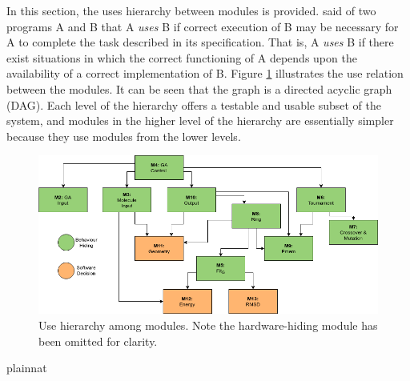 \documentclass[12pt, titlepage]{article}
\begin{document}
In this section, the uses hierarchy between modules is
provided. \citet{Parnas1978} said of two programs A and B that A {\em uses} B if
correct execution of B may be necessary for A to complete the task described in
its specification. That is, A {\em uses} B if there exist situations in which
the correct functioning of A depends upon the availability of a correct
implementation of B.  Figure \ref{FigUH} illustrates the use relation between
the modules. It can be seen that the graph is a directed acyclic graph
(DAG). Each level of the hierarchy offers a testable and usable subset of the
system, and modules in the higher level of the hierarchy are essentially simpler
because they use modules from the lower levels.

\begin{figure}[H]
\centering
\includegraphics[width=\textwidth]{MG_hierarchy_draft5.png}
\caption{Use hierarchy among modules. Note the hardware-hiding module has been 
omitted for clarity.}
\label{FigUH}
\end{figure}



 {plainnat}

\end{document}
